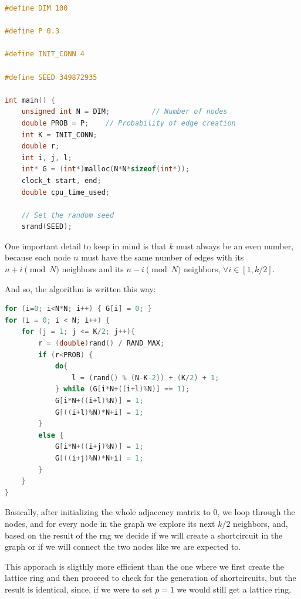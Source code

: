 \documentclass[titlepage]{article}
\begin{document}
\begin{minipage}{\linewidth}
\begin{lstlisting}[language=C, style=customc, breaklines=true]
#define DIM 100

#define P 0.3

#define INIT_CONN 4

#define SEED 349872935

int main() {
    unsigned int N = DIM;          // Number of nodes
    double PROB = P;    // Probability of edge creation
    int K = INIT_CONN;
    double r;
    int i, j, l;
    int* G = (int*)malloc(N*N*sizeof(int*));
    clock_t start, end;
    double cpu_time_used;

    // Set the random seed
    srand(SEED);
\end{lstlisting}
\end{minipage}

One important detail to keep in mind is that $k$ must always be an even number, because each node $n$ must have the same number of edges with its $n+i\pmod{N}$ neighbors and its $n-i\pmod{N}$ neighbors, $\forall i \in [1, k/2]$.

And so, the algorithm is written this way:

\begin{minipage}{\linewidth}
\begin{lstlisting}[language=C, style=customc, breaklines=true]
for (i=0; i<N*N; i++) { G[i] = 0; }
for (i = 0; i < N; i++) {
    for (j = 1; j <= K/2; j++){
        r = (double)rand() / RAND_MAX;
        if (r<PROB) {
            do{
                l = (rand() % (N-K-2)) + (K/2) + 1;
            } while (G[i*N+((i+l)%N)] == 1);
            G[i*N+((i+l)%N)] = 1;
            G[((i+l)%N)*N+i] = 1;
        }
        else {
            G[i*N+((i+j)%N)] = 1;
            G[((i+j)%N)*N+i] = 1;
        }
    }
}
\end{lstlisting}
\end{minipage}

Basically, after initializing the whole adjacency matrix to $0$, we loop through the nodes, and for every node in the graph we explore its next $k/2$ neighbors, and, based on the result of the rng we decide if we will create a shortcircuit in the graph or if we will connect the two nodes like we are expected to.

This apporach is sligthly more efficient than the one where we first create the lattice ring and then proceed to check for the generation of shortcircuits, but the result is identical, since, if we were to set $p=1$ we would still get a lattice ring.
\end{document}

